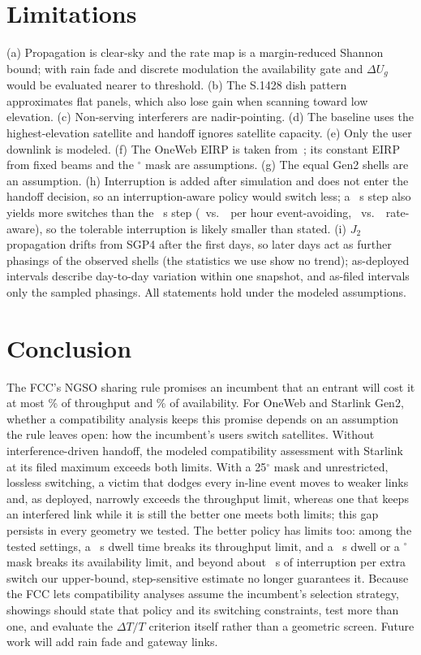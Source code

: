 \documentclass[conference]{IEEEtran}
\begin{document}
\section{Limitations}
(a) Propagation is clear-sky and the rate map is a margin-reduced Shannon bound;
with rain fade and discrete modulation the availability gate and $\Delta U_g$ would
be evaluated nearer to threshold. (b) The S.1428 dish pattern approximates flat
panels, which also lose gain when scanning toward low elevation. (c) Non-serving interferers are nadir-pointing. (d) The
baseline uses the highest-elevation satellite and handoff ignores satellite
capacity. (e) Only the user downlink is modeled. (f) The OneWeb EIRP is taken
from~\cite{delportillo2019}; its constant EIRP from fixed beams and the
\StationMinElevDeg$^\circ$ mask are assumptions. (g) The equal Gen2 shells are an assumption. (h) Interruption is added after simulation and does not enter the handoff
decision, so an interruption-aware policy would switch less; a \TsCheckStepS~s step
also yields more switches than the \TimeStepS~s step (\TsTwoEvAvSwitchesPerHour\ vs.\
\TsTenEvAvSwitchesPerHour\ per hour event-avoiding, \TsTwoRateMaxSwitchesPerHour\ vs.\
\TsTenRateMaxSwitchesPerHour\ rate-aware), so the tolerable interruption is likely
smaller than stated. (i) $J_2$ propagation drifts from SGP4 after the first days,
so later days act as further phasings of the observed shells (the statistics we
use show no trend); as-deployed intervals describe day-to-day variation within
one snapshot, and as-filed intervals only the sampled phasings. All statements hold under
the modeled assumptions.

\section{Conclusion}
The FCC's NGSO sharing rule promises an incumbent that an entrant will cost it at
most \DegradeLimitPct\% of throughput and \UnavailLimitPct\% of availability. For
OneWeb and Starlink Gen2, whether a compatibility analysis keeps this promise
depends on an assumption the rule leaves open: how the incumbent's users switch
satellites.
Without interference-driven handoff, the modeled compatibility assessment with
Starlink at its filed maximum exceeds both limits. With a 25$^\circ$ mask and unrestricted, lossless switching, a victim that
dodges every in-line event moves to weaker links and, as deployed, narrowly
exceeds the throughput limit, whereas one that keeps an interfered link while it
is still the better one meets both limits; this gap persists in every geometry
we tested. The better policy has limits
too: among the tested settings, a \DepDwellRateMaxDegrFirstExceedS~s dwell time
breaks its throughput limit, and a \DepDwellRateMaxUnavFirstExceedS~s dwell or a
\OnewebMinElevSensDeg$^\circ$ mask breaks its availability limit, and beyond about
\IntRateMaxMaxTauUnavS~s of interruption per extra switch our upper-bound,
step-sensitive estimate no longer guarantees it. Because the FCC lets compatibility analyses assume the
incumbent's selection strategy, showings should state that policy and its
switching constraints, test more than one, and evaluate the $\Delta T/T$
criterion itself rather than a geometric screen. Future work will add rain fade
and gateway links.
\end{document}

